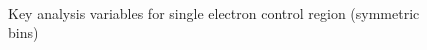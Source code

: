 \begin{figure}
\begin{center}
         \\
        \caption{Key analysis variables for single electron control region (symmetric bins)}
        \label{fig:distribution_singleele_sym}
    \end{center}
\end{figure}

